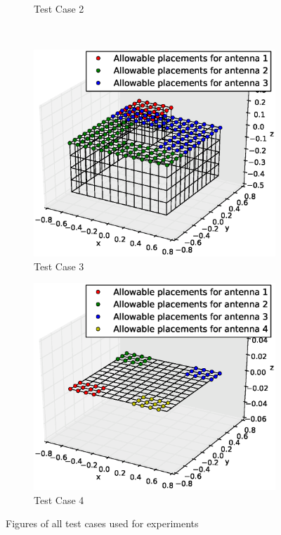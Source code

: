 \documentclass[conference]{IEEEtran}
\begin{document}
\begin{figure}
\begin{subfigure}{.5\columnwidth}
        \caption{Test Case 2}%
    \label{fig:tc2_figure}%
    \end{subfigure}\hfill\\%
    \begin{subfigure}{.5\columnwidth}
        \includegraphics[width=\columnwidth, height=\columnwidth]{FIG/tc_3_figure}%
        \caption{Test Case 3}%
    \label{fig:plat2}%
    \end{subfigure}\hfill%
    \begin{subfigure}{.5\columnwidth}
        \includegraphics[width=\columnwidth,height=\columnwidth]{FIG/tc_4_figure}%
        \caption{Test Case 4}%
        \label{fig:plat3}%
    \end{subfigure}\hfill
    \caption{Figures of all test cases used for experiments}
    \label{fig:tc_figures}
\end{figure}
\end{document}
